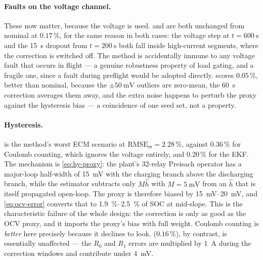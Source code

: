\paragraph{Faults on the voltage channel.} These now matter, because the voltage is used.
 and  are both unchanged from nominal at $0.17\,\%$, for the
same reason in both cases: the voltage step at $t=\SI{600}{\second}$ and the \SI{15}{\second}
dropout from $t=\SI{200}{\second}$ both fall inside high-current segments, where the correction is
switched off. The method is accidentally immune to any voltage fault that occurs in flight --- a
genuine robustness property of load gating, and a fragile one, since a fault during preflight would
be adopted directly.  scores $0.05\,\%$, better than nominal, because the
$\pm\SI{50}{\milli\volt}$ outliers are zero-mean, the \SI{60}{\second} correction averages them
away, and the extra noise happens to perturb the proxy against the hysteresis bias --- a coincidence
of one seed set, not a property.

\paragraph{Hysteresis.}  is the method's worst ECM scenario at
$\text{RMSE}_{\text{ss}} = 2.28\,\%$, against $0.36\,\%$ for Coulomb counting, which ignores the
voltage entirely, and $0.20\,\%$ for the EKF. The mechanism is \eqref{eq:hy-proxy}: the plant's
32-relay Preisach operator has a major-loop half-width of \SI{15}{\milli\volt} with the charging
branch above the discharging branch, while the estimator subtracts only $M\hat h$ with
$M = \SI{5}{\milli\volt}$ from an $\hat h$ that is itself propagated open-loop. The proxy is
therefore biased by \SIrange{15}{20}{\milli\volt}, and \eqref{eq:ocv-error} converts that to
\SIrange{1.9}{2.5}{\percent} of SOC at mid-slope. This is the characteristic failure of the whole
design: the correction is only as good as the OCV proxy, and it imports the proxy's bias with full
weight. Coulomb counting is \emph{better} here precisely because it declines to look.
 ($0.16\,\%$), by contrast, is essentially unaffected --- the $R_0$ and $R_1$
errors are multiplied by \SI{1}{\ampere} during the correction windows and contribute under
\SI{4}{\milli\volt}.

